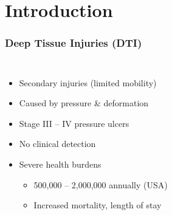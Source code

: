 \documentclass{beamer}
\begin{document}
	\section{Introduction}
		\begin{frame}
			\frametitle{Deep Tissue Injuries (DTI)}
			\begin{columns}[c]
				\begin{itemize}
					\item Secondary injuries (limited mobility)
					\item Caused by pressure \& deformation
					\item Stage III -- IV pressure ulcers
					\item No clinical detection
					\item Severe health burdens \cite{russo08}
					\begin{itemize}
						\item 500,000 -- 2,000,000 annually (USA)
						\item Increased mortality, length of stay
					\end{itemize}
				\end{itemize}


\end{columns}
\end{frame}
\end{document}
